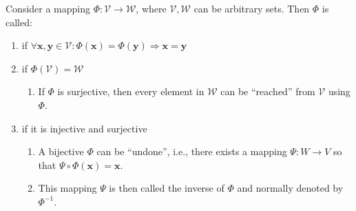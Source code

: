 Consider a mapping $\Phi : \mathcal{V} \to \mathcal{W}$, where $\mathcal{V}, \mathcal{W}$ can be arbitrary sets. 
Then $\Phi$ is called:
\hfill \cite{mfml/book/mml/Deisenroth-Faisal-Ong}

\begin{enumerate}
    \item 
    \begin{definition}[Injective] 
        if $\forall \bm{x}, \bm{y} \in \mathcal{V} : \Phi(\bm{x}) = \Phi(\bm{y}) \Rightarrow \bm{x} = \bm{y}$
        \hfill \cite{mfml/book/mml/Deisenroth-Faisal-Ong}
    \end{definition}

    \item 
    \begin{definition}[Surjective]
        if $\Phi(\mathcal{V}) = \mathcal{W}$
        \hfill \cite{mfml/book/mml/Deisenroth-Faisal-Ong}
    \end{definition}
    \begin{enumerate}
        \item If $\Phi$ is surjective, then every element in $\mathcal{W}$ can be “reached” from $\mathcal{V}$ using $\Phi$.
        \hfill \cite{mfml/book/mml/Deisenroth-Faisal-Ong}
    \end{enumerate}
    
    \item 
    \begin{definition}[Bijective]
        if it is injective and surjective
        \hfill \cite{mfml/book/mml/Deisenroth-Faisal-Ong}
    \end{definition}
    \begin{enumerate}
        \item A bijective $\Phi$ can be “undone”, i.e., there exists a mapping $\Psi : W \to V$ so that $\Psi \circ \Phi(\bm{x}) = \bm{x}$.
        \hfill \cite{mfml/book/mml/Deisenroth-Faisal-Ong}

        \item This mapping $\Psi$ is then called the inverse of $\Phi$ and normally denoted by $\Phi^{-1}$.
        \hfill \cite{mfml/book/mml/Deisenroth-Faisal-Ong}
    \end{enumerate}    

\end{enumerate}


















